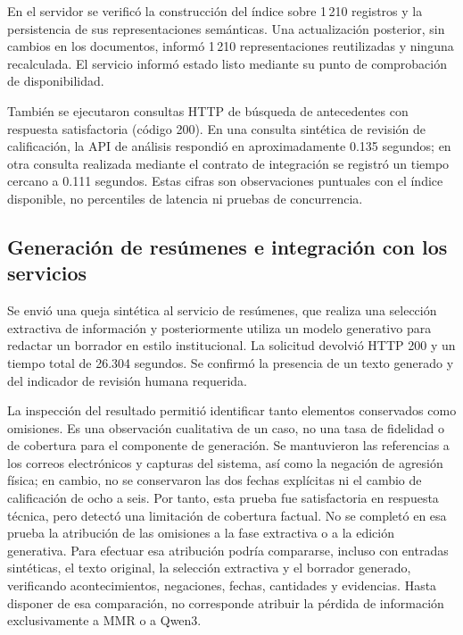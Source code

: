 En el servidor se verificó la construcción del índice sobre 1\,210 registros y la
persistencia de sus representaciones semánticas. Una actualización posterior, sin cambios
en los documentos, informó 1\,210 representaciones reutilizadas y ninguna recalculada.
El servicio informó estado listo mediante su punto de comprobación de disponibilidad.

También se ejecutaron consultas HTTP de búsqueda de antecedentes con respuesta satisfactoria
(código 200). En una consulta sintética de revisión de calificación, la API de análisis
respondió en aproximadamente 0.135 segundos; en otra consulta realizada mediante el contrato
de integración se registró un tiempo cercano a 0.111 segundos. Estas cifras son observaciones
puntuales con el índice disponible, no percentiles de latencia ni pruebas de concurrencia.

\subsection{Generación de resúmenes e integración con los servicios}
\label{sec:pruebas_ia_resumenes}

Se envió una queja sintética al servicio de resúmenes, que realiza una selección extractiva
de información y posteriormente utiliza un modelo generativo para redactar un borrador en
estilo institucional. La solicitud devolvió HTTP 200 y un tiempo total de 26.304 segundos.
Se confirmó la presencia de un texto generado y del indicador de revisión humana requerida.

La inspección del resultado permitió identificar tanto elementos conservados como omisiones.
Es una observación cualitativa de un caso, no una tasa de fidelidad o de cobertura
para el componente de generación.
Se mantuvieron las referencias a los correos electrónicos y capturas del sistema, así como
la negación de agresión física; en cambio, no se conservaron las dos fechas explícitas ni
el cambio de calificación de ocho a seis. Por tanto, esta prueba fue satisfactoria en
respuesta técnica, pero detectó una limitación de cobertura factual. No se completó en esa
prueba la atribución de las omisiones a la fase extractiva o a la edición generativa.
Para efectuar esa atribución podría compararse, incluso con entradas sintéticas,
el texto original, la selección extractiva y el borrador generado, verificando
acontecimientos, negaciones, fechas, cantidades y evidencias. Hasta disponer de
esa comparación, no corresponde atribuir la pérdida de información exclusivamente
a MMR o a Qwen3.

